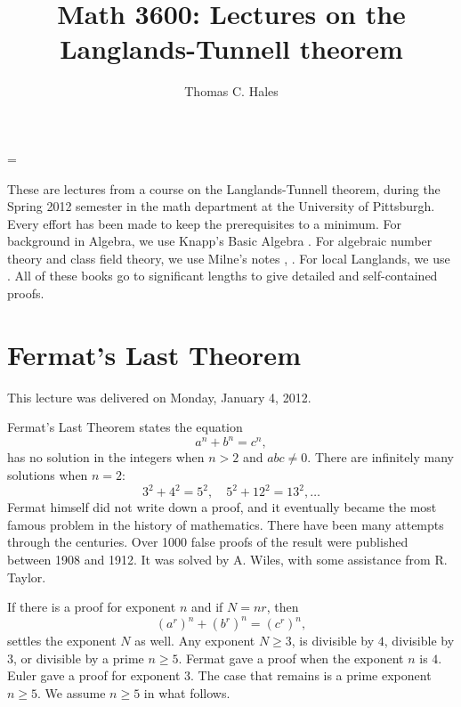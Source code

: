 \documentclass{llncs}
\begin{document}
\title{Math 3600: Lectures on the Langlands-Tunnell theorem}
\author{Thomas C. Hales}
\institute{\hbox{ }}
\maketitle




\parindent=0pt
\parskip=\baselineskip
\def\seg{~~~}
\def\text{\hbox}

These are lectures from a course on the Langlands-Tunnell theorem, during
the Spring 2012 semester in the math department at the University of Pittsburgh.
Every effort has been made to keep the prerequisites to a minimum.
For background in Algebra, we use Knapp's Basic Algebra \cite{knapp-basic}.
For algebraic number theory and class field theory, 
we use Milne's notes 
\cite{ANT}, \cite{CFT}.  For local Langlands, we use \cite{bushnell-henniart}.
All of these books go to significant lengths to give detailed and self-contained 
proofs.

\section{Fermat's Last Theorem}

This lecture was delivered on Monday, January 4, 2012.

Fermat's Last Theorem \cite{DDT} states the equation
\[
a^n + b^n = c^n,
\]
has no solution in the integers when $n>2$ and $abc\ne 0$.  There are
infinitely many solutions when $n=2$:
\[
3^2 + 4^2 = 5^2,\quad 5^2 + 12^2 = 13^2, \ldots
\]
Fermat himself did not write down a proof, and it eventually became
the most famous problem in the history of mathematics.  There have
been many attempts through the centuries.  Over 1000 false proofs of
the result were published between 1908 and 1912.  It was solved by
A. Wiles, with some assistance from R. Taylor.

If there is a proof for exponent $n$ and if $N = n r$, then
\[
(a^r)^n + (b^r)^n = (c^r)^n,
\]
settles the exponent $N$ as well.  Any exponent $N\ge3$, is divisible
by $4$, divisible by $3$, or divisible by a prime $n\ge 5$.  Fermat
gave a proof when the exponent $n$ is $4$.  Euler gave a proof for
exponent $3$.  The case that remains is a prime exponent $n\ge 5$.  We
assume $n\ge5$ in what follows.
\end{document}
